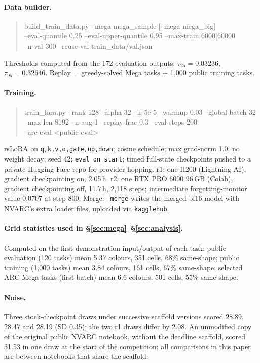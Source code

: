 \documentclass[11pt]{article}
\newcommand{\nvarc}{NVARC}
\newcommand{\mega}{ARC-Mega}
\begin{document}
\paragraph{Data builder.}
\begin{quote}\small\ttfamily build\_train\_data.py --mega mega\_sample [--mega mega\_big]\\ \phantom{xx}--eval-quantile 0.25 --eval-upper-quantile 0.95 --max-train 6000|60000\\ \phantom{xx}--n-val 300 --reuse-val train\_data/val.json\end{quote}
Thresholds computed from the 172 evaluation outputs: $\tau_{25}=0.03236$, $\tau_{95}=0.32646$. Replay = greedy-solved Mega tasks + 1{,}000 public training tasks.

\paragraph{Training.}
\begin{quote}\small\ttfamily train\_lora.py --rank 128 --alpha 32 --lr 5e-5 --warmup 0.03 --global-batch 32\\ \phantom{xx}--max-len 8192 --n-aug 1 --replay-frac 0.3 --eval-steps 200\\ \phantom{xx}--arc-eval <public eval>\end{quote}
rsLoRA on \texttt{q,k,v,o,gate,up,down}; cosine schedule; max grad-norm 1.0; no weight decay; seed 42; \texttt{eval\_on\_start}; timed full-state checkpoints pushed to a private Hugging Face repo for provider hopping. r1: one H200 (Lightning AI), gradient checkpointing on, 2.05\,h. r2: one RTX PRO 6000 96\,GB (Colab), gradient checkpointing off, 11.7\,h, 2{,}118 steps; intermediate forgetting-monitor value 0.0707 at step 800. Merge: \texttt{--merge} writes the merged bf16 model with \nvarc{}'s extra loader files, uploaded via \texttt{kagglehub}.

\paragraph{Grid statistics used in \S\ref{sec:mega}--\S\ref{sec:analysis}.}
Computed on the first demonstration input/output of each task: public evaluation (120 tasks) mean 5.37 colours, 351 cells, 68\% same-shape; public training (1{,}000 tasks) mean 3.84 colours, 161 cells, 67\% same-shape; selected \mega{} tasks (first batch) mean 6.6 colours, 501 cells, 55\% same-shape.

\paragraph{Noise.}
Three stock-checkpoint draws under successive scaffold versions scored 28.89, 28.47 and 28.19 (SD 0.35); the two r1 draws differ by 2.08. An unmodified copy of the original public \nvarc{} notebook, without the deadline scaffold, scored 31.53 in one draw at the start of the competition; all comparisons in this paper are between notebooks that share the scaffold.
\end{document}
